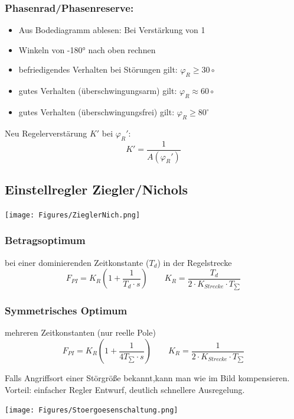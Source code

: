 \subsubsection{Phasenrad/Phasenreserve:}

\begin{itemize}[leftmargin=*]
	\item[] Aus Bodediagramm ablesen: Bei Verstärkung von 1
	\item[] Winkeln von -180° nach oben rechnen
	\item befriedigendes Verhalten bei Störungen gilt: $\varphi _R \geq 30\circ$
	\item gutes Verhalten (überschwingungsarm) gilt: $\varphi _R \approx  60\circ$
	\item gutes Verhalten (überschwingungsfrei) gilt: $\varphi _R \geq 80^\circ$
\end{itemize}
Neu Regelerverstärung $K'$ bei $\varphi_R'$:
\[ K' = \frac{1}{A(\varphi_R')}\]

\subsection{Einstellregler Ziegler/Nichols}
{\centering
\texttt{[image: Figures/ZieglerNich.png]}}

\subsubsection{Betragsoptimum}
bei einer dominierenden  Zeitkonstante ($T_d$) in der Regelstrecke
\[
	F_{PI} = K_R \left(1 + \dfrac{1}{T_d \cdot s}\right) \qquad K_R =\dfrac{T_d}{2 \cdot K_{Strecke} \cdot T_{\sum}}
\]

\subsubsection{Symmetrisches Optimum}
mehreren Zeitkonstanten (nur reelle Pole)
\[
	F_{PI} = K_R \left(1 + \dfrac{1}{4T_{\sum} \cdot s}\right) \qquad K_R =\dfrac{1}{2 \cdot K_{Strecke} \cdot T_{\sum}}
\]

\raggedright
\begin{mdframed}[style=exercise, frametitle=Störgrößenaufschaltung:]
	Falls Angriffsort einer Störgröße bekannt,kann man wie im Bild kompensieren.
	Vorteil: einfacher Regler Entwurf, deutlich schnellere Ausregelung.
\end{mdframed}

\texttt{[image: Figures/Stoergoesenschaltung.png]}


